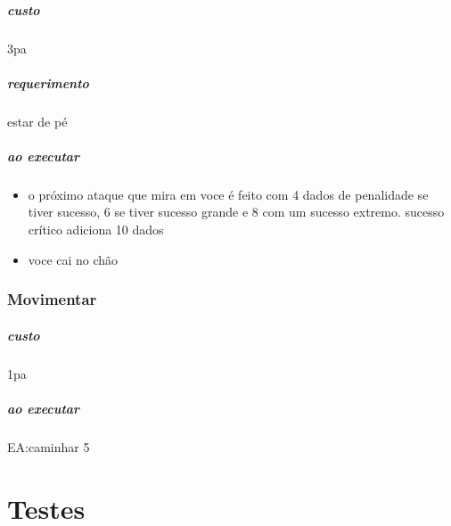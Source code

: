 \paragraph{custo} 3pa
\paragraph{requerimento} estar de pé 
\paragraph{ao executar} 
\begin{itemize}
  \item o próximo ataque que mira em voce é feito com 4 dados de penalidade se tiver sucesso, 
    6 se tiver sucesso grande e 8 com um sucesso extremo. sucesso crítico adiciona 10 dados %
  \item voce cai no chão
\end{itemize}
%
\subsection{Movimentar}
\paragraph{custo} 1pa
\paragraph{ao executar} EA:caminhar 5

%
%
%
%
\chapter{Testes}



